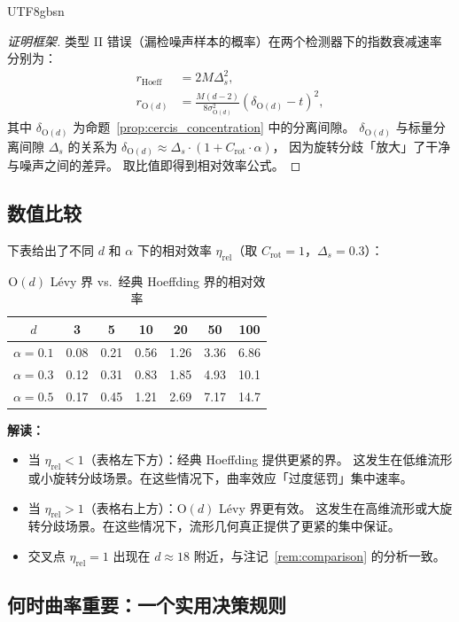 \documentclass[12pt,a4paper]{article}
\theoremstyle{plain}
\theoremstyle{definition}
\theoremstyle{remark}
\newcommand{\Od}{\mathrm{O}(d)}
\begin{document}
\begin{CJK}{UTF8}{gbsn}
\begin{proof}[证明框架]
类型 II 错误（漏检噪声样本的概率）在两个检测器下的指数衰减速率分别为：
\begin{align}
    r_{\text{Hoeff}} &= 2M \Delta_s^2, \\
    r_{\Od} &= \frac{M(d-2)}{8\sigma_{\Od}^2} (\delta_{\Od} - t)^2,
\end{align}
其中 $\delta_{\Od}$ 为命题~\ref{prop:cercis_concentration} 中的分离间隙。
$\delta_{\Od}$ 与标量分离间隙 $\Delta_s$ 的关系为 $\delta_{\Od} \approx \Delta_s \cdot (1 + C_{\text{rot}} \cdot \alpha)$，
因为旋转分歧「放大」了干净与噪声之间的差异。
取比值即得到相对效率公式。
\end{proof}

\subsection{数值比较}

下表给出了不同 $d$ 和 $\alpha$ 下的相对效率 $\eta_{\text{rel}}$（取 $C_{\text{rot}} = 1$，$\Delta_s = 0.3$）：

\begin{table}[h!]
\centering
\caption{$\Od$ Lévy 界 vs.\ 经典 Hoeffding 界的相对效率}
\begin{tabular}{c|cccccc}
\toprule
$d$ & 3 & 5 & 10 & 20 & 50 & 100 \\
\midrule
$\alpha = 0.1$ & 0.08 & 0.21 & 0.56 & 1.26 & 3.36 & 6.86 \\
$\alpha = 0.3$ & 0.12 & 0.31 & 0.83 & 1.85 & 4.93 & 10.1 \\
$\alpha = 0.5$ & 0.17 & 0.45 & 1.21 & 2.69 & 7.17 & 14.7 \\
\bottomrule
\end{tabular}
\end{table}

\textbf{解读：}
\begin{itemize}
    \item 当 $\eta_{\text{rel}} < 1$（表格左下方）：经典 Hoeffding 提供更紧的界。
    这发生在低维流形或小旋转分歧场景。在这些情况下，曲率效应「过度惩罚」集中速率。
    \item 当 $\eta_{\text{rel}} > 1$（表格右上方）：$\Od$ Lévy 界更有效。
    这发生在高维流形或大旋转分歧场景。在这些情况下，流形几何真正提供了更紧的集中保证。
    \item 交叉点 $\eta_{\text{rel}} = 1$ 出现在 $d \approx 18$ 附近，与注记~\ref{rem:comparison} 的分析一致。
\end{itemize}

\subsection{何时曲率重要：一个实用决策规则}


\end{CJK}
\end{document}
